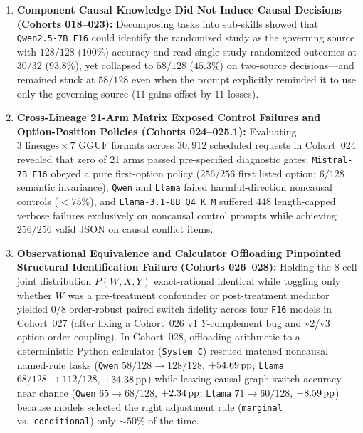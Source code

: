 \begin{enumerate}
  \item \textbf{Component Causal Knowledge Did Not Induce Causal Decisions (Cohorts 018--023):} Decomposing tasks into sub-skills showed that \texttt{Qwen2.5-7B F16} could identify the randomized study as the governing source with $128/128$ ($100\%$) accuracy and read single-study randomized outcomes at $30/32$ ($93.8\%$), yet collapsed to $58/128$ ($45.3\%$) on two-source decisions---and remained stuck at $58/128$ even when the prompt explicitly reminded it to use only the governing source ($11$ gains offset by $11$ losses).
  \item \textbf{Cross-Lineage 21-Arm Matrix Exposed Control Failures and Option-Position Policies (Cohorts 024--025.1):} Evaluating $3\text{ lineages}\times 7\text{ GGUF formats}$ across $30{,}912$ scheduled requests in Cohort~024 revealed that zero of 21 arms passed pre-specified diagnostic gates: \texttt{Mistral-7B F16} obeyed a pure first-option policy ($256/256$ first listed option; $6/128$ semantic invariance), \texttt{Qwen} and \texttt{Llama} failed harmful-direction noncausal controls ($<75\%$), and \texttt{Llama-3.1-8B Q4\_K\_M} suffered $448$ length-capped verbose failures exclusively on noncausal control prompts while achieving $256/256$ valid JSON on causal conflict items.
  \item \textbf{Observational Equivalence and Calculator Offloading Pinpointed Structural Identification Failure (Cohorts 026--028):} Holding the 8-cell joint distribution $P(W,X,Y)$ exact-rational identical while toggling only whether $W$ was a pre-treatment confounder or post-treatment mediator yielded $0/8$ order-robust paired switch fidelity across four \texttt{F16} models in Cohort~027 (after fixing a Cohort~026 v1 $Y$-complement bug and v2/v3 option-order coupling). In Cohort~028, offloading arithmetic to a deterministic Python calculator (\texttt{System C}) rescued matched noncausal named-rule tasks (\texttt{Qwen} $58/128 \to 128/128$, $+54.69\,\mathrm{pp}$; \texttt{Llama} $68/128 \to 112/128$, $+34.38\,\mathrm{pp}$) while leaving causal graph-switch accuracy near chance (\texttt{Qwen} $65 \to 68/128$, $+2.34\,\mathrm{pp}$; \texttt{Llama} $71 \to 60/128$, $-8.59\,\mathrm{pp}$) because models selected the right adjustment rule (\texttt{marginal} vs.\ \texttt{conditional}) only $\sim 50\%$ of the time.

\end{enumerate}
